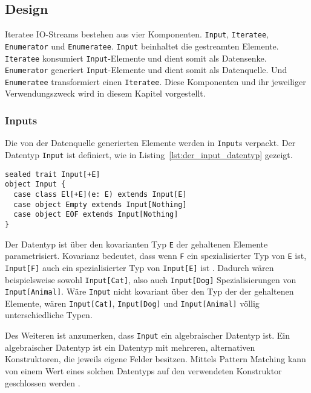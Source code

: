 \documentclass[draft=false
              ,paper=a4
              ,twoside=false
              ,fontsize=11pt
              ,headsepline
              ,BCOR10mm
              ,DIV11
              ]{scrbook}
\begin{document}
\subsection{Design} %
\label{sub:design}

Iteratee IO-Streams bestehen aus vier Komponenten.
\lstinline|Input|, \lstinline|Iteratee|, \lstinline|Enumerator| und \lstinline|Enumeratee|.
\lstinline|Input| beinhaltet die gestreamten Elemente.
\lstinline|Iteratee| konsumiert \lstinline|Input|-Elemente und dient somit als Datensenke.
\lstinline|Enumerator| generiert \lstinline|Input|-Elemente und dient somit als Datenquelle.
Und \lstinline|Enumeratee| transformiert einen \lstinline|Iteratee|.
Diese Komponenten und ihr jeweiliger Verwendungszweck wird in diesem Kapitel vorgestellt.


\subsubsection{Inputs} %
\label{ssub:design_inputs}

Die von der Datenquelle generierten Elemente werden in \lstinline|Input|s verpackt.
Der Datentyp \lstinline|Input| ist definiert, wie in Listing~\ref{lst:der_input_datentyp} gezeigt.

\begin{lstlisting}[caption=Der Input-Datentyp, label=lst:der_input_datentyp]
sealed trait Input[+E]
object Input {
  case class El[+E](e: E) extends Input[E]
  case object Empty extends Input[Nothing]
  case object EOF extends Input[Nothing]
}
\end{lstlisting}

Der Datentyp ist über den kovarianten Typ \lstinline|E| der gehaltenen Elemente parametrisiert.
Kovarianz bedeutet, dass wenn \lstinline|F| ein spezialisierter Typ von \lstinline|E| ist, \lstinline|Input[F]| auch ein spezialisierter Typ von \lstinline|Input[E]| ist \cite[vgl.][S.~11]{variance}.
Dadurch wären beispielsweise sowohl \lstinline|Input[Cat]|, also auch \lstinline|Input[Dog]| Spezialisierungen von \lstinline|Input[Animal]|.
Wäre \lstinline|Input| nicht kovariant über den Typ der der gehaltenen Elemente, wären \lstinline|Input[Cat]|, \lstinline|Input[Dog]| und \lstinline|Input[Animal]| völlig unterschiedliche Typen.

Des Weiteren ist anzumerken, dass \lstinline|Input| ein algebraischer Datentyp ist.
Ein algebraischer Datentyp ist ein Datentyp mit mehreren, alternativen Konstruktoren, die jeweils eigene Felder besitzen.
Mittels Pattern Matching kann von einem Wert eines solchen Datentyps auf den verwendeten Konstruktor geschlossen werden \cite[vgl.][S.~14--15]{algebraic_data_type}.
\end{document}
